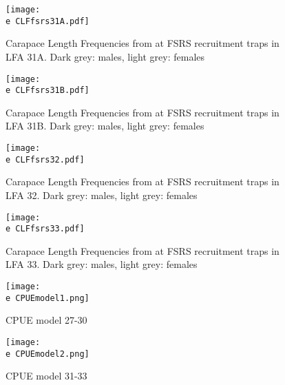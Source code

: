 \documentclass[11pt]{article}
\newcommand{\e}{\string~/bio.data/bio.lobster/figures/LFA2733Framework2018/} %
\begin{document}
    \begin{figure}
    \centering
        \texttt{[image: \\e CLFfsrs31A.pdf]}
        \caption{Carapace Length Frequencies from at FSRS recruitment traps in LFA 31A. Dark grey: males, light grey: females}

    \end{figure}


    \begin{figure}
    \centering
        \texttt{[image: \\e CLFfsrs31B.pdf]}
        \caption{Carapace Length Frequencies from at FSRS recruitment traps in LFA 31B. Dark grey: males, light grey: females}

    \end{figure}


    \begin{figure}
    \centering
        \texttt{[image: \\e CLFfsrs32.pdf]}
        \caption{Carapace Length Frequencies from at FSRS recruitment traps in LFA 32. Dark grey: males, light grey: females}

    \end{figure}


    \begin{figure}
    \centering
        \texttt{[image: \\e CLFfsrs33.pdf]}
        \caption{Carapace Length Frequencies from at FSRS recruitment traps in LFA 33. Dark grey: males, light grey: females}

    \end{figure}


    \begin{figure}
    \centering
        \texttt{[image: \\e CPUEmodel1.png]}
        \caption{CPUE model 27-30}

    \end{figure}


    \begin{figure}
    \centering
        \texttt{[image: \\e CPUEmodel2.png]}
        \caption{CPUE model 31-33}

    \end{figure}
\end{document}
